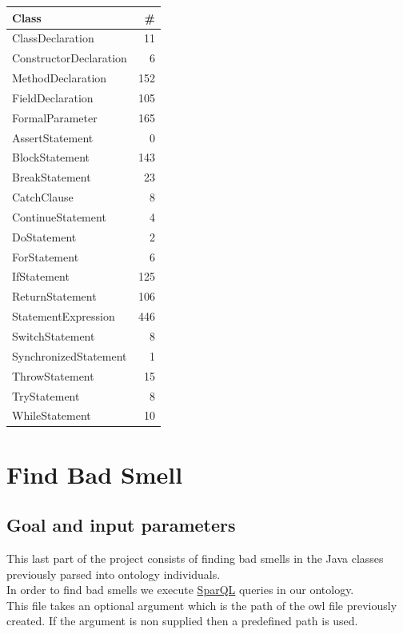 \documentclass [14 pt]{article}
\begin{document}
\begin{table}[H]
\centering
\begin{tabular}{| l r |}
\hline
\textbf{Class}			&  \textbf{\#}	\\ \hline\hline
ClassDeclaration 		&	11	\\
ConstructorDeclaration	&	6	\\
MethodDeclaration		&	152	\\
FieldDeclaration		&	105	\\
FormalParameter			&	165	\\ \hline
AssertStatement			&	0	\\ 
BlockStatement			&	143	\\ 
BreakStatement			&	23	\\ 
CatchClause				&	8	\\ 
ContinueStatement		&	4	\\ 
DoStatement				&	2	\\
ForStatement				&	6	\\
IfStatement				&	125	\\
ReturnStatement			&	106	\\
StatementExpression		&	446	\\
SwitchStatement			&	8	\\
SynchronizedStatement	&	1	\\
ThrowStatement			&	15	\\
TryStatement				&	8	\\
WhileStatement			&	10	\\ \hline
\hline
\end{tabular}
\label{tab:Population}
\end{table}

\newpage
\section{Find Bad Smell}
\subsection{Goal and input parameters}
This last part of the project consists of finding bad smells in the Java classes previously parsed into ontology individuals.\\
In order to find bad smells we execute \href{https://rdflib.readthedocs.io/en/stable/apidocs/rdflib.plugins.sparql.html}{SparQL} queries in our ontology.\\
This file takes an optional argument which is the path of the owl file previously created. If the argument is non supplied then a predefined path is used.
\end{document}
